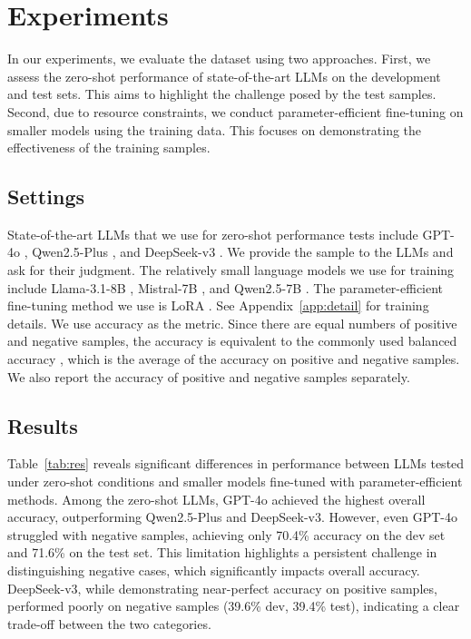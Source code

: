 \section{Experiments}
In our experiments, we evaluate the dataset using two approaches. First, we assess the zero-shot performance of state-of-the-art LLMs on the development and test sets. This aims to highlight the challenge posed by the test samples. Second, due to resource constraints, we conduct parameter-efficient fine-tuning on smaller models using the training data. This focuses on demonstrating the effectiveness of the training samples.

\subsection{Settings}


State-of-the-art LLMs that we use for zero-shot performance tests include GPT-4o \cite{openai2024gpt4technicalreport}, Qwen2.5-Plus \cite{qwen2024qwen25technicalreport}, and DeepSeek-v3 \cite{deepseekai2024deepseekv3technicalreport}. We provide the sample to the LLMs and ask for their judgment. The relatively small language models we use for training include Llama-3.1-8B \cite{grattafiori2024llama3herdmodels}, Mistral-7B \cite{jiang2023mistral7b}, and Qwen2.5-7B \cite{qwen2024qwen25technicalreport}. The parameter-efficient fine-tuning method we use is LoRA \cite{DBLP:conf/iclr/HuSWALWWC22}. See Appendix~\ref{app:detail} for training details. We use accuracy as the metric. Since there are equal numbers of positive and negative samples, the accuracy is equivalent to the commonly used balanced accuracy \cite{DBLP:journals/corr/abs-2303-15621}, which is the average of the accuracy on positive and negative samples. We also report the accuracy of positive and negative samples separately.





\subsection{Results}

Table~\ref{tab:res} reveals significant differences in performance between LLMs tested under zero-shot conditions and smaller models fine-tuned with parameter-efficient methods. Among the zero-shot LLMs, GPT-4o achieved the highest overall accuracy, outperforming Qwen2.5-Plus and DeepSeek-v3. However, even GPT-4o struggled with negative samples, achieving only 70.4\% accuracy on the dev set and 71.6\% on the test set. This limitation highlights a persistent challenge in distinguishing negative cases, which significantly impacts overall accuracy. DeepSeek-v3, while demonstrating near-perfect accuracy on positive samples, performed poorly on negative samples (39.6\% dev, 39.4\% test), indicating a clear trade-off between the two categories.

